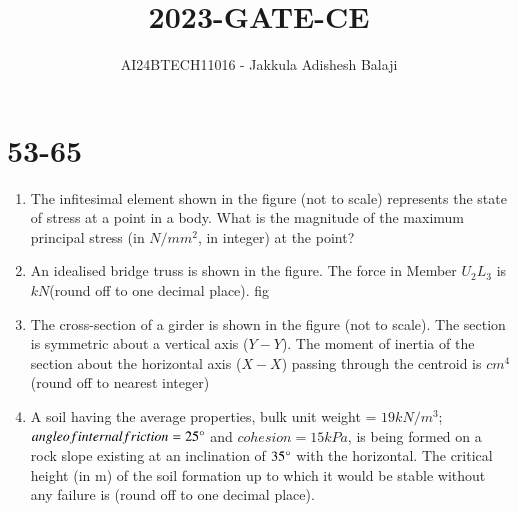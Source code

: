 \documentclass[journal]{IEEEtran}
\begin{document}

\title{2023-GATE-CE}
\author{AI24BTECH11016 - Jakkula Adishesh Balaji}
{\let\newpage\relax\maketitle}

\renewcommand{\thefigure}{\theenumi}
\renewcommand{\thetable}{\theenumi}
\setlength{\intextsep}{10pt} %
\section{53-65}
\begin{enumerate}
	\item
	The infitesimal element shown in the figure (not to scale) represents the state of stress at a point in a body. What is the magnitude of the maximum principal stress (in $N/mm^{2}$, in integer) at the point?
	\begin{figure}[H]
    		\centering
    		
    		\caption{}
    		\label{36}
	\end{figure}
	\item
	An idealised bridge truss is shown in the figure. The force in Member $U_{2}L_{3}$ is $kN$(round off to one decimal place).
	fig\begin{figure}[H]
    		\centering
    		
    		\caption{}
    		\label{36}
	\end{figure}
	\item 
	The cross-section of a girder is shown in the figure (not to scale). The section is symmetric about a vertical axis ($Y-Y$). The moment of inertia of the section about the horizontal axis ($X-X$) passing through the centroid is $cm^{4}$ (round off to nearest integer)
	\begin{figure}[H]
    		\centering
    		
    		\caption{}
    		\label{36}
	\end{figure}
	\item
	A soil having the average properties, bulk unit weight = $19 kN/m^{3}$; $angle of internal friction = 25 \degree $ and $cohesion = 15 kPa$, is being formed on a rock slope existing at an inclination of $35 \degree $ with the horizontal. The critical height (in m) of the soil formation up to which it would be stable without any failure is (round off to one decimal place).
	\\
	[Assume the soil is being formed parallel to the rock bedding plane and there is no ground water effect.]

\end{enumerate}
\end{document}
